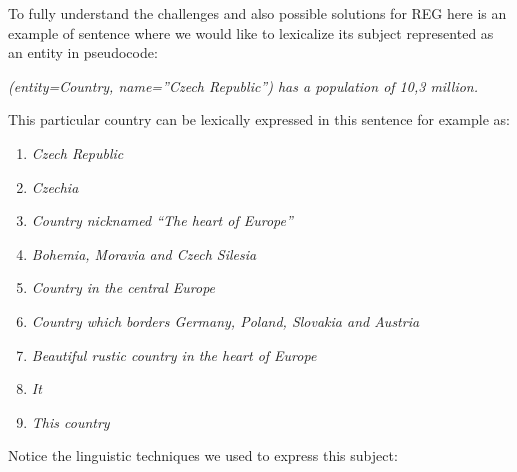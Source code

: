 To fully understand the challenges and also possible solutions for REG here is an example of sentence where we would like to lexicalize its subject represented as an entity in pseudocode:
\begin{center}
\emph{(entity=Country, name=”Czech Republic”) has a population of 10,3 million.}
\end{center}
This particular country can be lexically expressed in this sentence for example as:
\begin{enumerate}
	\item \emph{Czech Republic} \label{reg-1}
	\item \emph{Czechia} \label{reg-2}
	\item \emph{Country nicknamed “The heart of Europe”} \label{reg-3}
	\item \emph{Bohemia, Moravia and Czech Silesia} \label{reg-4}
	\item \emph{Country in the central Europe} \label{reg-5}
	\item \emph{Country which borders Germany, Poland, Slovakia and Austria} \label{reg-6}
	\item \emph{Beautiful rustic country in the heart of Europe} \label{reg-7}
	\item \emph{It} \label{reg-8}
	\item \emph{This country} \label{reg-9}
\end{enumerate}
Notice the linguistic techniques we used to express this subject:
